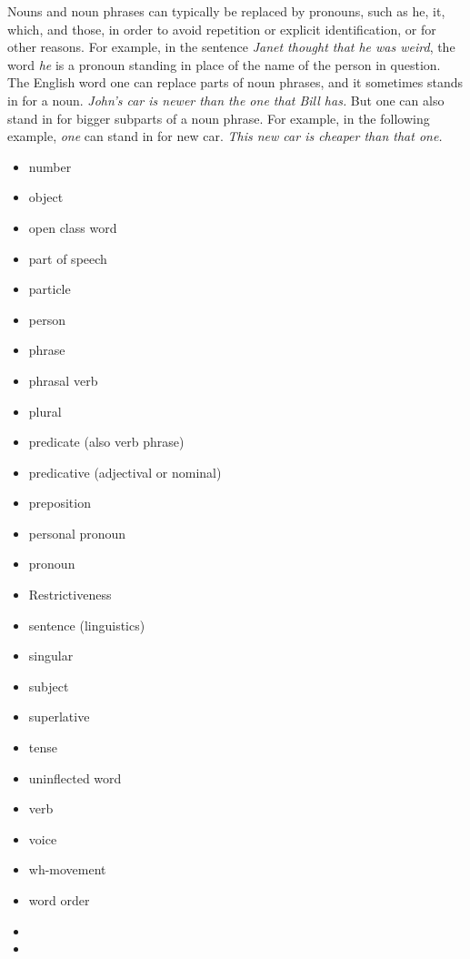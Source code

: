 \begin{small}
Nouns and noun phrases can typically be replaced by pronouns, such as he, it, which, and those, in order to avoid repetition or explicit identification, or for other reasons. For example, in the sentence \emph{Janet thought that he was weird}, the word \emph{he} is a pronoun standing in place of the name of the person in question. The English word one can replace parts of noun phrases, and it sometimes stands in for a noun. \emph{John's car is newer than the one that Bill has.}  But one can also stand in for bigger subparts of a noun phrase. For example, in the following example, \emph{one} can stand in for new car.  \emph{This new car is cheaper than that one.}


\begin{itemize}
  \item number
  \item object
  \item open class word
  \item part of speech
  \item particle
  \item person
  \item phrase
  \item phrasal verb
  \item plural
  \item predicate (also verb phrase)
  \item predicative (adjectival or nominal)
  \item preposition
  \item personal pronoun
  \item pronoun
  \item Restrictiveness
  \item sentence (linguistics)
  \item singular
  \item subject
  \item superlative
  \item tense
  \item uninflected word
  \item verb
  \item voice
  \item wh-movement
  \item word order
  \item
  \item
\end{itemize}
\end{small}

